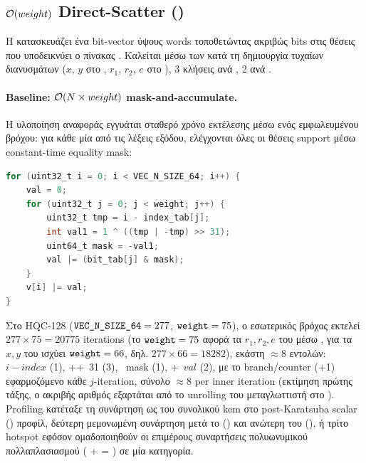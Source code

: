\subsection{\texorpdfstring{$\mathcal{O}(weight)$}{O(weight)} Direct-Scatter ()}
\label{ssec:scatter}

Η  κατασκευάζει ένα bit-vector ύψους
 words τοποθετώντας ακριβώς  bits στις
θέσεις που υποδεικνύει ο πίνακας . Καλείται μέσω των
 κατά τη δημιουργία τυχαίων διανυσμάτων
($x$, $y$ στο \KeyGen, $r_1$, $r_2$, $e$ στο \Encaps), \num{3} κλήσεις
ανά \Encaps, \num{2} ανά \KeyGen.

\paragraph{Baseline: $\mathcal{O}(N \times weight)$ mask-and-accumulate.}
Η υλοποίηση αναφοράς εγγυάται σταθερό χρόνο εκτέλεσης μέσω ενός
εμφωλευμένου βρόχου: για κάθε μία από τις  λέξεις
εξόδου, ελέγχονται όλες οι  θέσεις support μέσω constant-time
equality mask:

\begin{lstlisting}[language=C, basicstyle=\small\ttfamily]
for (uint32_t i = 0; i < VEC_N_SIZE_64; i++) {
    val = 0;
    for (uint32_t j = 0; j < weight; j++) {
        uint32_t tmp = i - index_tab[j];
        int val1 = 1 ^ ((tmp | -tmp) >> 31);
        uint64_t mask = -val1;
        val |= (bit_tab[j] & mask);
    }
    v[i] |= val;
}
\end{lstlisting}

Στο HQC-128 ($\texttt{VEC\_N\_SIZE\_64}=277$, $\texttt{weight}=75$), ο
εσωτερικός βρόχος εκτελεί $277 \times 75 = 20775$ iterations (το $\texttt{weight}=75$ αφορά τα $r_1, r_2, e$ του \Encaps μέσω , για τα $x, y$ του \KeyGen ισχύει $\texttt{weight}=66$, δηλ. $277 \times 66 = 18282$),
εκάστη $\approx\num{8}$ εντολών: ~$i-\mathit{index}$ (1),
++~31 (3), ~mask (1),
+~$\mathit{val}$ (2), με το branch/counter (+1)
εφαρμοζόμενο κάθε $j$-iteration, σύνολο $\approx 8$ per inner
iteration (εκτίμηση πρώτης τάξης, ο ακριβής αριθμός εξαρτάται από
το unrolling του μεταγλωττιστή στο ).  Profiling κατέταξε τη συνάρτηση ως 
του συνολικού \gls{kem} \instret στο post-Karatsuba scalar () προφίλ, δεύτερη μεμονωμένη
συνάρτηση μετά το  () και ανώτερη του
 (), ή τρίτο hotspot εφόσον
ομαδοποιηθούν οι επιμέρους συναρτήσεις πολυωνυμικού πολλαπλασιασμού
(  +  
= ) σε μία κατηγορία.

